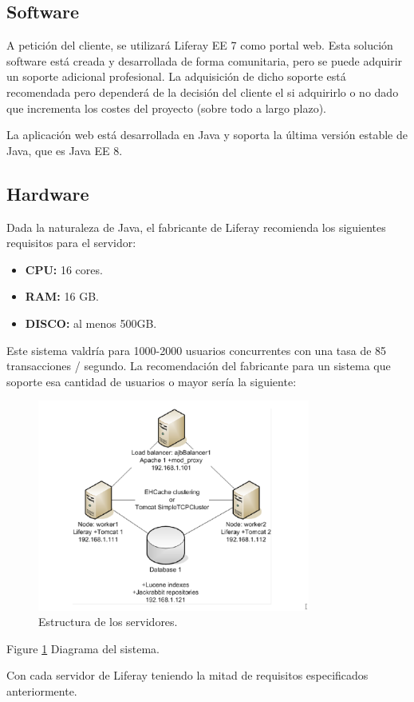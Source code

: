 \subsection{Software}
\par A petición del cliente, se utilizará Liferay EE 7 como portal web. Esta solución software está creada y desarrollada de forma comunitaria, pero se puede adquirir un soporte adicional profesional. La adquisición de dicho soporte está recomendada pero dependerá de la decisión del cliente el si adquirirlo o no dado que incrementa los costes del proyecto (sobre todo a largo plazo).
\par La aplicación web está desarrollada en Java y soporta la última versión estable de Java, que es Java EE 8.

\subsection{Hardware}
\par Dada la naturaleza de Java, el fabricante de Liferay recomienda los siguientes requisitos para el servidor:
\begin{itemize}
	\item \textbf{CPU:} 16 cores.
	\item \textbf{RAM:} 16 GB.
	\item \textbf{DISCO:} al menos 500GB.
\end{itemize}
\par Este sistema valdría para 1000-2000 usuarios concurrentes con una tasa de 85 transacciones / segundo. La recomendación del fabricante para un sistema que soporte esa cantidad de usuarios o mayor sería la siguiente:

\begin{figure}
  \centering
    \includegraphics[width=0.8\textwidth]{img/systemstructure.png}
  \caption{Estructura de los servidores.}
  \label{fig:systemstructure}
\end{figure}
Figure \ref{fig:systemstructure} Diagrama del sistema.

\par Con cada servidor de Liferay teniendo la mitad de requisitos especificados anteriormente.